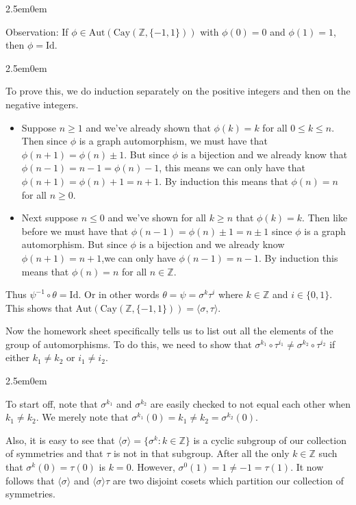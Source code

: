 \documentclass{book}
\newcommand{\HexTwoP}{%
   \color{RedViolet}%
   \fontsize{12}{13}\selectfont%
}
\newenvironment{myIndent}{%
   \begin{adjustwidth}{2.5em}{0em}%
}{%
   \end{adjustwidth}%
}
\newcommand{\Cay}{\ensuremath{\mathrm{Cay}}}
\newcommand{\myId}{\mathrm{Id}}
\newcommand{\Aut}{\mathrm{Aut}}
\newcommand{\retTwo}{\hfill\bigbreak}
\begin{document}
\begin{myIndent}
	Observation: If $\phi \in \Aut(\Cay(\mathbb{Z}, \{-1, 1\}))$ with $\phi(0) = 0$ and $\phi(1) = 1$, then $\phi = \myId$.
	\begin{myIndent}\HexTwoP
		To prove this, we do induction separately on the positive integers and then on the negative integers.
		\begin{itemize}
			\item Suppose $n \geq 1$ and we've already shown that $\phi(k) = k$ for all $0 \leq k \leq n$. Then since $\phi$ is a graph automorphism, we must have that $\phi(n + 1) = \phi(n) \pm 1$. But since $\phi$ is a bijection and we already know that $\phi(n-1) = n-1 =\phi(n) - 1$, this means we can only have that $\phi(n+1) = \phi(n) + 1 = n + 1$. By induction this means that $\phi(n) = n$ for all $n \geq 0$.\retTwo
			
			\item Next suppose $n \leq 0$ and we've shown for all $k \geq n$ that $\phi(k) = k$. Then like before we must have that $\phi(n - 1) = \phi(n) \pm 1 = n \pm 1$ since $\phi$ is a graph automorphism. But since $\phi$ is a bijection and we already know $\phi(n + 1) = n + 1$,\newpage we can only have $\phi(n - 1) = n - 1$. By induction this means that $\phi(n) = n$ for all $n \in \mathbb{Z}$.\retTwo
		\end{itemize}
	\end{myIndent}

	Thus $\psi^{-1} \circ \theta = \myId$. Or in other words $\theta = \psi = \sigma^k \tau^i$ where $k \in \mathbb{Z}$ and $i \in \{0, 1\}$. This shows that $\Aut(\Cay(\mathbb{Z}, \{-1, 1\})) = \langle \sigma, \tau\rangle$.\retTwo

	Now the homework sheet specifically tells us to list out all the elements of the group of automorphisms. To do this, we need to show that $\sigma^{k_1} \circ \tau^{i_1} \neq \sigma^{k_2} \circ \tau^{i_2}$ if either $k_1 \neq k_2$ or $i_1 \neq i_2$. 
	\begin{myIndent}\HexTwoP
		To start off, note that $\sigma^{k_1}$ and $\sigma^{k_2}$ are easily checked to not equal each other when\\ $k_1 \neq k_2$. We merely note that $\sigma^{k_1}(0) = k_1 \neq k_2 = \sigma^{k_2}(0)$.\retTwo
		
		Also, it is easy to see that $\langle \sigma \rangle = \{\sigma^k : k \in \mathbb{Z}\}$ is a cyclic subgroup of our collection of symmetries and that $\tau$ is not in that subgroup. After all the only $k \in \mathbb{Z}$ such that $\sigma^k(0) = \tau(0)$ is $k = 0$. However, $\sigma^0(1) = 1 \neq -1 = \tau(1)$. It now follows that $\langle \sigma \rangle$ and $\langle \sigma \rangle \tau$ are two disjoint cosets which partition our collection of symmetries.\retTwo


\end{myIndent}
\end{myIndent}
\end{document}

